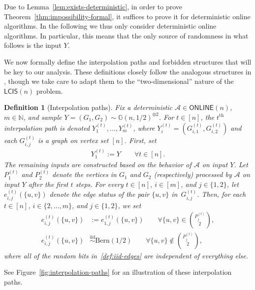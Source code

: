 \documentclass[11pt]{article}
\theoremstyle{plain}
\newtheorem{definition}{Definition}
\theoremstyle{definition}
\theoremstyle{remark}
\newcommand{\Gnhalf}{\mathbb{G}(n,1/2)}
\newcommand{\N}{\mathbb{N}}
\newcommand{\MCS}{\mathsf{LCIS}}
\newcommand{\Alg}{\mathcal{A}}
\newcommand{\online}{\mathsf{ONLINE}}
\begin{document}
Due to Lemma~\ref{lem:exists-deterministic}, 
in order to prove Theorem~\ref{thm:impossibility-formal}, it suffices to prove it for deterministic online algorithms. 
In the following we thus only consider deterministic online algorithms. 
In particular, this means that the only source of randomness in what follows is the input $Y$. 

We now formally define the interpolation paths and forbidden structures that will be key to our analysis. These definitions closely follow the analogous structures in \cite{GKW25}, 
though we take care to 
adapt them to the ``two-dimensional'' nature of the $\MCS(n)$ problem. 

\begin{definition}[Interpolation paths]\label{def:interpolation-paths}
    Fix a deterministic $\Alg \in \online(n)$, $m \in \N$, and sample $Y = (G_{1}, G_{2}) \sim \Gnhalf^{\otimes 2}$. For $t \in [n]$, the $t^\text{th}$ \emph{interpolation path} is denoted $Y_1^{(t)}, \dots, Y_m^{(t)}$, where $Y_i^{(t)} = \left(G_{i, 1}^{(t)}, G_{i, 2}^{(t)}\right)$ and each $G_{i,j}^{(t)}$ is a graph on vertex set $[n]$. First, set
    \begin{align}
        Y_1^{(t)} := Y \qquad \forall t \in [n]. \label{def:first-Y}
    \end{align}
    The remaining inputs are constructed based on the behavior of $\Alg$ on input $Y$. 
    Let $P_1^{(t)}$ and $P_2^{(t)}$ denote the vertices in $G_1$ and $G_2$ (respectively) processed by $\Alg$ on input $Y$ after the first $t$ steps. 
    For every $t \in [n]$, $i \in [m]$, and $j \in \{1, 2\}$, let $e_{i, j}^{(t)}(\{u, v\})$ denote the edge status of the pair $\{u, v\}$ in~$G_{i, j}^{(t)}$. 
    Then, for each $t \in [n]$, $i \in \{2, \ldots, m \}$, and $j \in \{1, 2\}$, we set
    \begin{align}
        e_{i,j}^{(t)}(\{u, v\}) &:= e_{1, j}^{(t)}(\{u, v\}) \qquad \forall \{u, v\} \in \binom{P_j^{(t)}}{2}, \label{def:same-edges} \\
        e_{i,j}^{(t)}(\{u, v\}) &\overset{\text{iid}}{\sim} \mathrm{Bern}(1/2) \qquad \forall \{u, v\} \notin \binom{P_j^{(t)}}{2}, \label{def:iid-edges}
    \end{align}
    where all of the random bits in~\eqref{def:iid-edges} are independent of everything else.
\end{definition}
See Figure~\ref{fig:interpolation-paths} for an illustration of these interpolation paths. 
\end{document}
